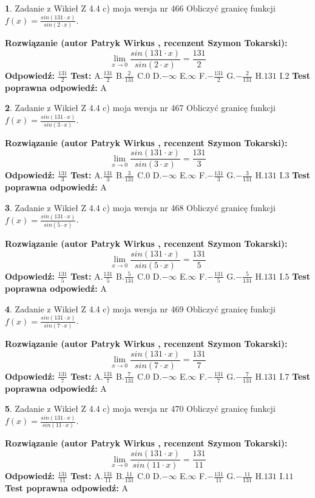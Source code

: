 \documentclass[12pt, a4paper]{article}
\theoremstyle{definition} %
\newtheorem{zad}{}
\newcommand{\zadStart}[1]{\begin{zad}#1\newline}
\newcommand{\zadStop}{\end{zad}}
\newcommand{\rozwStart}[2]{\noindent \textbf{Rozwiązanie (autor #1 , recenzent #2): }\newline}
\newcommand{\rozwStop}{\newline}
\newcommand{\odpStart}{\noindent \textbf{Odpowiedź:}\newline}
\newcommand{\odpStop}{\newline}
\newcommand{\testStart}{\noindent \textbf{Test:}\newline}
\newcommand{\testStop}{\newline}
\newcommand{\kluczStart}{\noindent \textbf{Test poprawna odpowiedź:}\newline}
\newcommand{\kluczStop}{\newline}
\begin{document}
\zadStart{Zadanie z Wikieł Z 4.4 c) moja wersja nr 466}
Obliczyć granicę funkcji $f(x)=\frac{sin(131\cdot x)}{sin(2\cdot x)}$.
\zadStop
\rozwStart{Patryk Wirkus}{Szymon Tokarski}
$$\lim\limits_{x\to 0}\frac{sin(131\cdot x)}{sin(2\cdot x)}=
\frac{131}{2}$$
\rozwStop
\odpStart
$\frac{131}{2}$
\odpStop
\testStart
A.$\frac{131}{2}$
B.$\frac{2}{131}$
C.$0$
D.$-\infty$
E.$\infty$
F.$-\frac{131}{2}$
G.$-\frac{2}{131}$
H.$131$
I.$2$
\testStop
\kluczStart
A
\kluczStop



\zadStart{Zadanie z Wikieł Z 4.4 c) moja wersja nr 467}
Obliczyć granicę funkcji $f(x)=\frac{sin(131\cdot x)}{sin(3\cdot x)}$.
\zadStop
\rozwStart{Patryk Wirkus}{Szymon Tokarski}
$$\lim\limits_{x\to 0}\frac{sin(131\cdot x)}{sin(3\cdot x)}=
\frac{131}{3}$$
\rozwStop
\odpStart
$\frac{131}{3}$
\odpStop
\testStart
A.$\frac{131}{3}$
B.$\frac{3}{131}$
C.$0$
D.$-\infty$
E.$\infty$
F.$-\frac{131}{3}$
G.$-\frac{3}{131}$
H.$131$
I.$3$
\testStop
\kluczStart
A
\kluczStop



\zadStart{Zadanie z Wikieł Z 4.4 c) moja wersja nr 468}
Obliczyć granicę funkcji $f(x)=\frac{sin(131\cdot x)}{sin(5\cdot x)}$.
\zadStop
\rozwStart{Patryk Wirkus}{Szymon Tokarski}
$$\lim\limits_{x\to 0}\frac{sin(131\cdot x)}{sin(5\cdot x)}=
\frac{131}{5}$$
\rozwStop
\odpStart
$\frac{131}{5}$
\odpStop
\testStart
A.$\frac{131}{5}$
B.$\frac{5}{131}$
C.$0$
D.$-\infty$
E.$\infty$
F.$-\frac{131}{5}$
G.$-\frac{5}{131}$
H.$131$
I.$5$
\testStop
\kluczStart
A
\kluczStop



\zadStart{Zadanie z Wikieł Z 4.4 c) moja wersja nr 469}
Obliczyć granicę funkcji $f(x)=\frac{sin(131\cdot x)}{sin(7\cdot x)}$.
\zadStop
\rozwStart{Patryk Wirkus}{Szymon Tokarski}
$$\lim\limits_{x\to 0}\frac{sin(131\cdot x)}{sin(7\cdot x)}=
\frac{131}{7}$$
\rozwStop
\odpStart
$\frac{131}{7}$
\odpStop
\testStart
A.$\frac{131}{7}$
B.$\frac{7}{131}$
C.$0$
D.$-\infty$
E.$\infty$
F.$-\frac{131}{7}$
G.$-\frac{7}{131}$
H.$131$
I.$7$
\testStop
\kluczStart
A
\kluczStop



\zadStart{Zadanie z Wikieł Z 4.4 c) moja wersja nr 470}
Obliczyć granicę funkcji $f(x)=\frac{sin(131\cdot x)}{sin(11\cdot x)}$.
\zadStop
\rozwStart{Patryk Wirkus}{Szymon Tokarski}
$$\lim\limits_{x\to 0}\frac{sin(131\cdot x)}{sin(11\cdot x)}=
\frac{131}{11}$$
\rozwStop
\odpStart
$\frac{131}{11}$
\odpStop
\testStart
A.$\frac{131}{11}$
B.$\frac{11}{131}$
C.$0$
D.$-\infty$
E.$\infty$
F.$-\frac{131}{11}$
G.$-\frac{11}{131}$
H.$131$
I.$11$
\testStop
\kluczStart
A
\kluczStop
\end{document}
